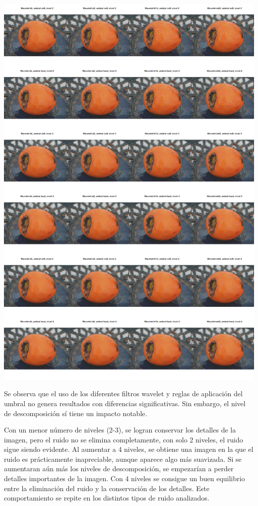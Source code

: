 \documentclass[
]{article}
\begin{document}
\begin{center}\includegraphics[width=1\linewidth]{denoisedwt2d/gaussian_denoised} \end{center}

Se observa que el uso de los diferentes filtros wavelet y reglas de
aplicación del umbral no genera resultados con diferencias
significativas. Sin embargo, el nivel de descomposición sí tiene un
impacto notable.

Con un menor número de niveles (2-3), se logran conservar los detalles
de la imagen, pero el ruido no se elimina completamente, con solo 2
niveles, el ruido sigue siendo evidente. Al aumentar a 4 niveles, se
obtiene una imagen en la que el ruido es prácticamente inapreciable,
aunque aparece algo más suavizada. Si se aumentaran aún más los niveles
de descomposición, se empezarían a perder detalles importantes de la
imagen. Con 4 niveles se consigue un buen equilibrio entre la
eliminación del ruido y la conservación de los detalles. Este
comportamiento se repite en los distintos tipos de ruido analizados.
\end{document}
